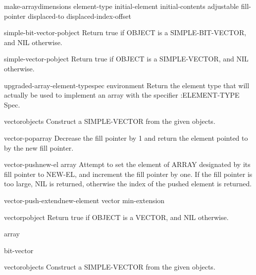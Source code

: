 \begin{function}{make-array}{dimensions \key element-type initial-element initial-contents adjustable
 fill-pointer displaced-to displaced-index-offset}{}{}
  
\end{function}

\begin{function}{simple-bit-vector-p}{object}{}{}
  Return true if OBJECT is a SIMPLE-BIT-VECTOR, and NIL otherwise.
\end{function}

\begin{function}{simple-vector-p}{object}{}{}
  Return true if OBJECT is a SIMPLE-VECTOR, and NIL otherwise.
\end{function}

\begin{function}{upgraded-array-element-type}{spec \op environment}{}{}
  Return the element type that will actually be used to implement an array
   with the specifier :ELEMENT-TYPE Spec.
\end{function}

\begin{function}{vector}{\rest objects}{}{}
  Construct a SIMPLE-VECTOR from the given objects.
\end{function}

\begin{function}{vector-pop}{array}{}{}
  Decrease the fill pointer by 1 and return the element pointed to by the
  new fill pointer.
\end{function}

\begin{function}{vector-push}{new-el array}{}{}
  Attempt to set the element of ARRAY designated by its fill pointer
   to NEW-EL, and increment the fill pointer by one. If the fill pointer is
   too large, NIL is returned, otherwise the index of the pushed element is
   returned.
\end{function}

\begin{function}{vector-push-extend}{new-element vector \op min-extension}{}{}
  
\end{function}

\begin{function}{vectorp}{object}{}{}
  Return true if OBJECT is a VECTOR, and NIL otherwise.
\end{function}

\begin{class}{array}{}{}{}
  
\end{class}

\begin{class}{bit-vector}{}{}{}
  
\end{class}

\begin{class}{vector}{\rest objects}{}{}
  Construct a SIMPLE-VECTOR from the given objects.
\end{class}
